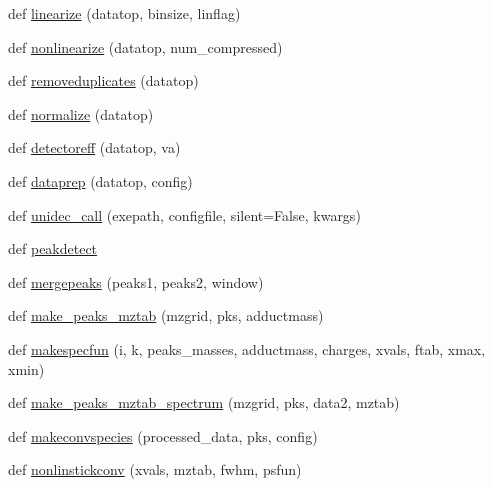 \begin{DoxyCompactItemize}
\item 
def \hyperlink{namespace_uni_dec_1_1unidec__modules_1_1unidectools_a44066d6a5460480bea45249206d7841f}{linearize} (datatop, binsize, linflag)
\item 
def \hyperlink{namespace_uni_dec_1_1unidec__modules_1_1unidectools_a07be742c6ed1fe22bdf60e22549a8ea6}{nonlinearize} (datatop, num\+\_\+compressed)
\item 
def \hyperlink{namespace_uni_dec_1_1unidec__modules_1_1unidectools_a83ab42b0db8b4616d5b8c688088207d8}{removeduplicates} (datatop)
\item 
def \hyperlink{namespace_uni_dec_1_1unidec__modules_1_1unidectools_a60befaedd904996c1fea9bae1425ceb0}{normalize} (datatop)
\item 
def \hyperlink{namespace_uni_dec_1_1unidec__modules_1_1unidectools_a437913c12cdcefb7c3c8c583c4c35363}{detectoreff} (datatop, va)
\item 
def \hyperlink{namespace_uni_dec_1_1unidec__modules_1_1unidectools_a006d1635def673dcf78c3df36bbebed0}{dataprep} (datatop, config)
\item 
def \hyperlink{namespace_uni_dec_1_1unidec__modules_1_1unidectools_a8c6dcf03d064b5e6cb12f86935db8b40}{unidec\+\_\+call} (exepath, configfile, silent=False, kwargs)
\item 
def \hyperlink{namespace_uni_dec_1_1unidec__modules_1_1unidectools_abb3233047d0d34b9d778fbf5f08c7f8b}{peakdetect}
\item 
def \hyperlink{namespace_uni_dec_1_1unidec__modules_1_1unidectools_a258b170acba077b359c1a5e5e4bb4eba}{mergepeaks} (peaks1, peaks2, window)
\item 
def \hyperlink{namespace_uni_dec_1_1unidec__modules_1_1unidectools_a608ebd565dc6f2f4db320ec37bec1da5}{make\+\_\+peaks\+\_\+mztab} (mzgrid, pks, adductmass)
\item 
def \hyperlink{namespace_uni_dec_1_1unidec__modules_1_1unidectools_a58a66aded0d9732ef4e1f75f59725814}{makespecfun} (i, k, peaks\+\_\+masses, adductmass, charges, xvals, ftab, xmax, xmin)
\item 
def \hyperlink{namespace_uni_dec_1_1unidec__modules_1_1unidectools_a0292223a8d4c283c0fa453969c30d24d}{make\+\_\+peaks\+\_\+mztab\+\_\+spectrum} (mzgrid, pks, data2, mztab)
\item 
def \hyperlink{namespace_uni_dec_1_1unidec__modules_1_1unidectools_ad162d7813268cda34e2330652d925379}{makeconvspecies} (processed\+\_\+data, pks, config)
\item 
def \hyperlink{namespace_uni_dec_1_1unidec__modules_1_1unidectools_a5bf435b3223be663bf5c79072a461c25}{nonlinstickconv} (xvals, mztab, fwhm, psfun)

\end{DoxyCompactItemize}
